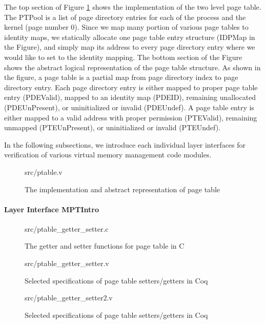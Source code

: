The top section of Figure \ref{fig:ptable_v} shows the implementation of the two level page table.
The \textsf{PTPool} is a list of page directory entries for each of the process and the kernel (page number 0).
Since we map many portion of various page tables to identity maps, we statically allocate one page table entry
structure (\textsf{IDPMap} in the Figure), and simply map its address to every page directory entry where
we would like to set to the identity mapping.
The bottom section of the Figure shows the abstract logical representation of the page table structure.
As shown in the figure, a page table is a partial map from page directory index to page directory entry.
Each page directory entry is either mapped to proper page table entry (\textsf{PDEValid}),
mapped to an identity map (\textsf{PDEID}), remaining unallocated (\textsf{PDEUnPresent}), or uninitialized or invalid (\textsf{PDEUndef}).
A page table entry is either mapped to a valid address with proper permission (\textsf{PTEValid}), remaining unmapped (\textsf{PTEUnPresent}),
or uninitialized or invalid (\textsf{PTEUndef}).

In the following subsections, we introduce each individual layer interfaces for verification of various
virtual memory management code modules.

\begin{figure}
	 {src/ptable.v}
	\caption{The implementation and abstract representation of page table}
	\label{fig:ptable_v}
\end{figure}

\paragraph{Layer Interface MPTIntro}

\begin{figure}
	 {src/ptable_getter_setter.c}
	\caption{The getter and setter functions for page table in C}
	\label{fig:ptable_getter_setter_c}
\end{figure}

\begin{figure}
	 {src/ptable_getter_setter.v}
	\caption{Selected specifications of page table setters/getters in Coq}
	\label{fig:ptable_getter_setter_v}
\end{figure}

\begin{figure}
	 {src/ptable_getter_setter2.v}
	\caption{Selected specifications of page table setters/getters in Coq}
	\label{fig:ptable_getter_setter2_v}
\end{figure}

